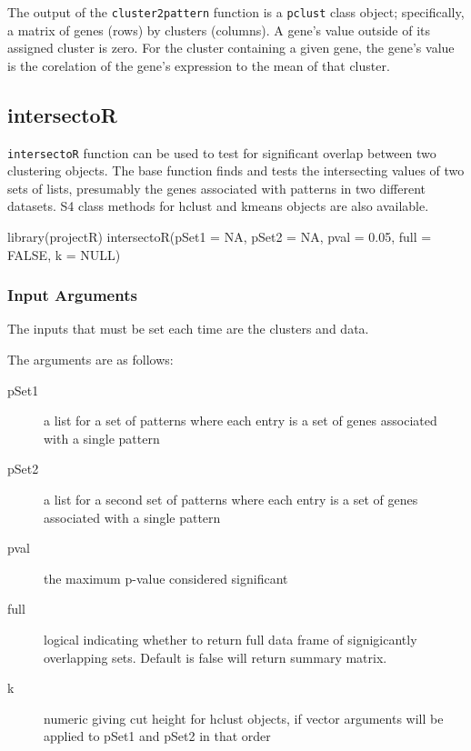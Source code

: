 \documentclass[]{article}
\renewenvironment{verbatim}{\color{codecolor}\begin{myshaded}\begin{oldverbatim}}{\end{oldverbatim}\end{myshaded}}
\begin{document}
The output of the \texttt{cluster2pattern} function is a \texttt{pclust} class object; specifically, a matrix of genes (rows) by clusters (columns). A gene's value outside of its assigned cluster is zero. For the cluster containing a given gene, the gene's value is the corelation of the gene's expression to the mean of that cluster.

\hypertarget{intersector}{%
\subsection{intersectoR}\label{intersector}}

\texttt{intersectoR} function can be used to test for significant overlap between two clustering objects. The base function finds and tests the intersecting values of two sets of lists, presumably the genes associated with patterns in two different datasets. S4 class methods for hclust and kmeans objects are also available.

\begin{verbatim}
library(projectR)
intersectoR(pSet1 = NA, pSet2 = NA, pval = 0.05, full = FALSE, k = NULL)
\end{verbatim}

\hypertarget{input-arguments-3}{%
\subsubsection{Input Arguments}\label{input-arguments-3}}

The inputs that must be set each time are the clusters and data.

The arguments are as follows:

\begin{description}
\item[pSet1]{a list for a set of patterns where each entry is a set of genes associated with a single pattern}
\item[pSet2]{a list for a second set of patterns where each entry is a set of genes associated with a single pattern}
\item[pval]{the maximum p-value considered significant}
\item[full]{logical indicating whether to return full data frame of signigicantly overlapping sets. Default is false will return summary matrix.}
\item[k]{numeric giving cut height for hclust objects, if vector arguments will be applied to pSet1 and pSet2 in that order}
\end{description}
\end{document}

